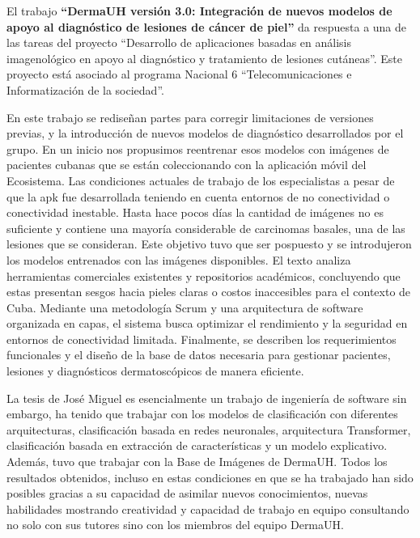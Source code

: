 \begin{opinion}
    El trabajo \textbf{“DermaUH versión 3.0: Integración de nuevos modelos de apoyo al diagnóstico de 
    lesiones de cáncer de piel”} da respuesta a una de las tareas del proyecto “Desarrollo de 
    aplicaciones basadas en análisis imagenológico en apoyo al diagnóstico y tratamiento de 
    lesiones cutáneas”. Este proyecto está asociado al programa Nacional 6 “Telecomunicaciones
    e Informatización de la sociedad”.

    En este trabajo se rediseñan partes para corregir limitaciones de versiones previas, y 
    la introducción de nuevos modelos de diagnóstico desarrollados por el grupo. En un 
    inicio nos propusimos reentrenar esos modelos con imágenes de pacientes cubanas que se 
    están coleccionando con la aplicación móvil del Ecosistema. Las condiciones actuales de 
    trabajo de los especialistas a pesar de que la apk fue desarrollada teniendo en cuenta 
    entornos de no conectividad o conectividad inestable. Hasta hace pocos días la cantidad 
    de imágenes no es suficiente y contiene una mayoría considerable de carcinomas basales, 
    una de las lesiones que se consideran. Este objetivo tuvo que ser pospuesto y se 
    introdujeron los modelos entrenados con las imágenes disponibles. El texto analiza 
    herramientas comerciales existentes y repositorios académicos, concluyendo que estas 
    presentan sesgos hacia pieles claras o costos inaccesibles para el contexto de Cuba. 
    Mediante una metodología Scrum y una arquitectura de software organizada en capas, el 
    sistema busca optimizar el rendimiento y la seguridad en entornos de conectividad 
    limitada. Finalmente, se describen los requerimientos funcionales y el diseño de la 
    base de datos necesaria para gestionar pacientes, lesiones y diagnósticos dermatoscópicos
    de manera eficiente.

    La tesis de José Miguel es esencialmente un trabajo de ingeniería de software sin embargo,
    ha tenido que trabajar con los modelos de clasificación con diferentes arquitecturas, 
    clasificación basada en redes neuronales, arquitectura Transformer, clasificación basada 
    en extracción de características y un modelo explicativo. Además, tuvo que trabajar con 
    la Base de Imágenes de DermaUH. Todos los resultados obtenidos, incluso en estas 
    condiciones en que se ha trabajado han sido posibles gracias a su capacidad de asimilar 
    nuevos conocimientos, nuevas habilidades mostrando creatividad y capacidad de trabajo 
    en equipo consultando no solo con sus tutores sino con los miembros del equipo DermaUH.


\end{opinion}
